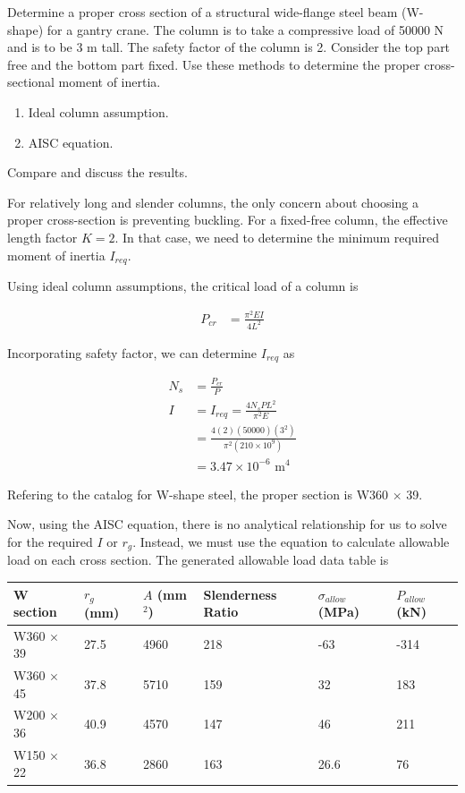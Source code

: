 \documentclass[
10pt,
a4paper,
openany,
svgnames,
]{book}
\begin{document}
\begin{example}
  Determine a proper cross section of a structural wide-flange steel beam (W-shape) for a gantry crane. The column is to take a compressive load of 50000 N and is to be 3 m tall. The safety factor of the column is 2. Consider the top part free and the bottom part fixed. Use these methods to determine the proper cross-sectional moment of inertia.
  \begin{enumerate}
  \item Ideal column assumption.
  \item AISC equation.
  \end{enumerate}
  Compare and discuss the results.
\end{example}
\begin{solution}
  For relatively long and slender columns, the only concern about choosing a proper cross-section is preventing buckling. For a fixed-free column, the effective length factor $K = 2$. In that case, we need to determine the minimum required moment of inertia $I_{req}$.

  Using ideal column assumptions, the critical load of a column is

  \begin{align*}
    P_{cr} &= \frac{\pi^2 EI}{4L^2}
  \end{align*}

  Incorporating safety factor, we can determine $I_{req}$ as
  
  \begin{align*}
    N_s &= \frac{P_{cr}}{P} \\
    I &= I_{req} = \frac{4 N_s P L^2}{\pi^2 E} \\
        &= \frac{4(2)(50000)(3^2)}{\pi^2 (210 \times 10^9)} \\
        &= 3.47 \times 10^{-6} \text{ m}^4
  \end{align*}

  Refering to the catalog for W-shape steel, the proper section is W360 $\times$ 39.

  Now, using the AISC equation, there is no analytical relationship for us to solve for the required $I$ or $r_g$. Instead, we must use the equation to calculate allowable load on each cross section. The generated allowable load data table is
  
  \begin{tabular}{ L{2.5cm} C{2cm} C{2cm} C{2cm} C{2cm} C{2cm}}
    \toprule
    W section & $r_g$ (mm) & $A$ (mm$^2$) & Slenderness Ratio & $\sigma_{allow}$ (MPa) & $P_{allow}$ (kN) \\
    \midrule
    W360 $\times$ 39 & 27.5 & 4960 & 218 & -63  & -314 \\
    W360 $\times$ 45 & 37.8 & 5710 & 159 & 32   & 183 \\
    W200 $\times$ 36 & 40.9 & 4570 & 147 & 46   & 211 \\
    W150 $\times$ 22 & 36.8 & 2860 & 163 & 26.6 & 76 \\
    \bottomrule
  \end{tabular}
  

\end{solution}
\end{document}
